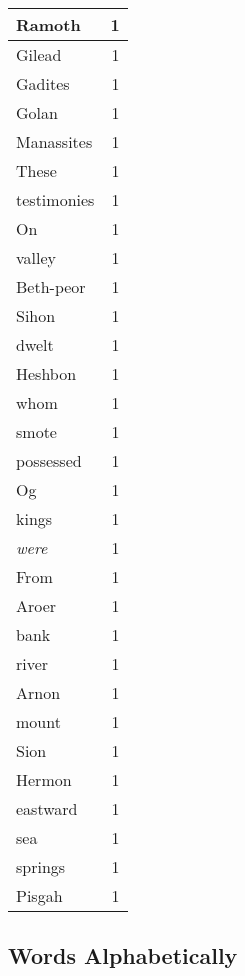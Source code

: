 \begin{center}
\begin{longtable}{l|r}
Ramoth & 1 \\ \hline
Gilead & 1 \\ \hline
Gadites & 1 \\ \hline
Golan & 1 \\ \hline
Manassites & 1 \\ \hline
These & 1 \\ \hline
testimonies & 1 \\ \hline
On & 1 \\ \hline
valley & 1 \\ \hline
Beth-peor & 1 \\ \hline
Sihon & 1 \\ \hline
dwelt & 1 \\ \hline
Heshbon & 1 \\ \hline
whom & 1 \\ \hline
smote & 1 \\ \hline
possessed & 1 \\ \hline
Og & 1 \\ \hline
kings & 1 \\ \hline
\emph{were} & 1 \\ \hline
From & 1 \\ \hline
Aroer & 1 \\ \hline
bank & 1 \\ \hline
river & 1 \\ \hline
Arnon & 1 \\ \hline
mount & 1 \\ \hline
Sion & 1 \\ \hline
Hermon & 1 \\ \hline
eastward & 1 \\ \hline
sea & 1 \\ \hline
springs & 1 \\ \hline
Pisgah & 1 \\ \hline
\end{longtable}
\end{center}



\normalsize



\subsection{Words Alphabetically}

